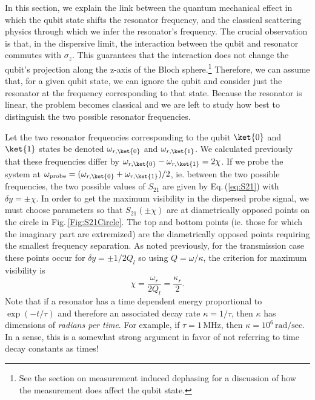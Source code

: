 
In this section, we explain the link between the quantum mechanical effect in which the qubit state shifts the resonator frequency, and the classical scattering physics through which we infer the resonator's frequency.
The crucial observation is that, in the dispersive limit, the interaction between the qubit and resonator commutes with $\sigma_z$.
This guarantees that the interaction does not change the qubit's projection along the z-axis of the Bloch sphere.\footnote{See the section on measurement induced dephasing for a discussion of how the measurement does affect the qubit state.}
Therefore, we can assume that, for a given qubit state, we can ignore the qubit and consider just the resonator at the frequency corresponding to that state.
Because the resonator is linear, the problem becomes classical and we are left to study how best to distinguish the two possible resonator frequencies.

Let the two resonator frequencies corresponding to the qubit $\ket{0}$ and $\ket{1}$ states be denoted $\omega_{r,\ket{0}}$ and $\omega_{r,\ket{1}}$.
We calculated previously that these frequencies differ by $\omega_{r,\ket{0}} - \omega_{r,\ket{1}} = 2\chi$.
If we probe the system at $\omega_{\text{probe}} = (\omega_{r,\ket{0}} + \omega_{r,\ket{1}})/2$, ie. between the two possible frequencies, the two possible values of $S_{21}$ are given by Eq.\,(\ref{eq:S21}) with $\delta y = \pm \chi$.
In order to get the maximum visibility in the dispersed probe signal, we must choose parameters so that $S_{21}(\pm \chi)$ are at diametrically opposed points on the circle in Fig.\,\ref{Fig:S21Circle}.
The top and bottom points (ie. those for which the imaginary part are extremized) are the diametrically opposed points requiring the smallest frequency separation.
As noted previously, for the transmission case these points occur for $\delta y = \pm 1/2Q_l$ so using $Q = \omega / \kappa$, the criterion for maximum visibility is
\begin{equation}
\chi = \frac{\omega_r}{2Q_l} = \frac{\kappa_r}{2}. \label{eq:chiVsKappa_r}
\end{equation}
Note that if a resonator has a time dependent energy proportional to $\exp(-t/\tau)$ and therefore an associated decay rate $\kappa = 1/\tau$, then $\kappa$ has dimensions of \emph{radians per time}.
For example, if $\tau=1 \, \text{MHz}$, then $\kappa = 10^6 \, \text{rad}/\text{sec}$.
In a sense, this is a somewhat strong argument in favor of not referring to time decay constants as times!
